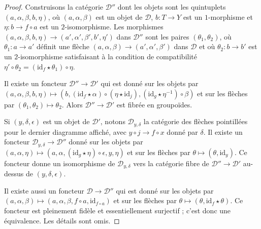 \begin{proof}
Construisons la catégorie $\mathcal{D}''$ dont les objets sont les quintuplets
$(a,\alpha,\beta,b,\eta)$,
où $(a,\alpha,\beta)$ est un objet de $\mathcal{D}$,
$b \colon T \rightarrow Y$ est un $1$-morphisme
et $\eta \colon b \rightarrow f \circ a$ est un $2$-isomorphisme.
Les morphismes
$(a,\alpha,\beta,b,\eta) \rightarrow (a',\alpha',\beta',b',\eta')$
dans $\mathcal{D}''$
sont les paires $(\theta_1,\theta_2)$, où
$\theta_1 \colon a \rightarrow a'$ définit une flèche
$(a, \alpha, \beta) \rightarrow (a', \alpha', \beta')$
dans $\mathcal{D}$ et où $\theta_2 \colon b \rightarrow b'$ est un
$2$-isomorphisme satisfaisant à la condition de compatibilité
$\eta' \circ \theta_2 = (\text{id}_f \star \theta_1) \circ \eta$.

\medskip\noindent
Il existe un foncteur $\mathcal{D}'' \rightarrow \mathcal{D}'$ qui est donné
sur les objets par
$(a, \alpha, \beta, b, \eta) \mapsto
(b, (\text{id}_f \star \alpha) \circ (\eta \star \text{id}_j),
(\text{id}_g \star \eta^{-1}) \circ \beta)$
et sur les flèches par $(\theta_1,\theta_2) \mapsto \theta_2$.
Alors $\mathcal{D}'' \rightarrow \mathcal{D}'$ est fibrée en groupoïdes.

\medskip\noindent
Si $(y, \delta, \epsilon)$ est un objet de $\mathcal{D}'$, notons
$\mathcal{D}_{y,\delta}$
la catégorie des flèches pointillées pour le dernier diagramme affiché, avec
$y \circ j \rightarrow f \circ x$ donné par $\delta$.
Il existe un foncteur $\mathcal{D}_{y,\delta} \rightarrow \mathcal{D}''$ donné
sur les objets par
$(a, \alpha, \eta) \mapsto
(a, \alpha, (\text{id}_g \star \eta) \circ \epsilon, y, \eta)$
et sur les flèches par $\theta \mapsto (\theta, \text{id}_y)$.
Ce foncteur donne un isomorphisme de $\mathcal{D}_{y,\delta}$ vers
la catégorie fibre de $\mathcal{D}'' \rightarrow \mathcal{D}'$ au-dessus de
$(y,\delta,\epsilon)$.

\medskip\noindent
Il existe aussi un foncteur $\mathcal{D} \rightarrow \mathcal{D}''$ qui est
donné sur les objets par
$(a,\alpha,\beta) \mapsto (a,\alpha,\beta,f \circ a, \text{id}_{f \circ a})$
et sur les flèches par
$\theta \mapsto (\theta, \text{id}_f \star \theta)$.
Ce foncteur est pleinement fidèle et essentiellement surjectif ; c'est donc une
équivalence. Les détails sont omis.
\end{proof}














